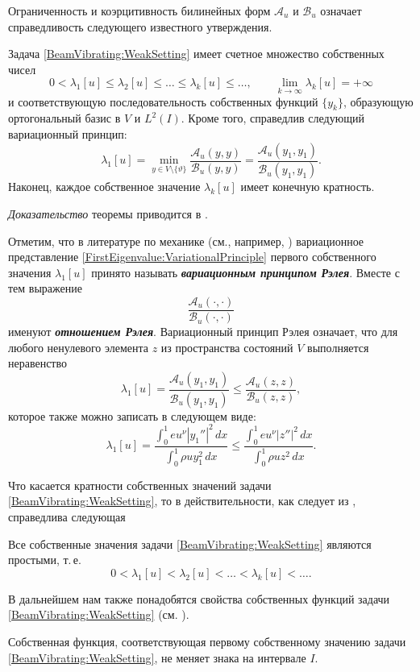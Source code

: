 %
%
%
Ограниченность и коэрцитивность билинейных форм
$\mathcal{A}_u$ и $\mathcal{B}_u$ означает справедливость следующего известного утверждения.
%
%
%
\begin{theorem}
Задача
\eqref{BeamVibrating:WeakSetting}
имеет счетное множество собственных чисел
\[
0 < \lambda_1[u] \leq \lambda_2[u] \leq \ldots
\leq 
\lambda_k[u] \leq \ldots,
\qquad
\lim_{k \to \infty} \lambda_k[u] = +\infty
\]
и соответствующую последовательность собственных функций $\{ y_k \}$,
образующую ортогональный базис в $V$ и $L^2(I)$.
%
%
%
Кроме того, справедлив следующий вариационный принцип:
\begin{equation}
\label{FirstEigenvalue:VariationalPrinciple}
\lambda_1[u]
=
\min_{y \in V \setminus \{ \vartheta \}} \frac{\mathcal{A}_u(y,y)}{\mathcal{B}_u(y,y)}
=
\frac{\mathcal{A}_u(y_1,y_1)}{\mathcal{B}_u(y_1,y_1)}.
\end{equation}
%
%
%
Наконец, каждое собственное значение
$\lambda_k[u]$ имеет конечную кратность.
\end{theorem}
%
%
%
\noindent\emph{Доказательство} теоремы приводится в \cite{book:Litvinov}.
%
%
%
\par
Отметим,
что в литературе по механике (см., например,
\cite{book:Banichuk}) вариационное представление
\eqref{FirstEigenvalue:VariationalPrinciple}
первого собственного значения $\lambda_1[u]$
принято называть \emph{\textbf{вариационным принципом Рэлея}}.
%
%
%
Вместе с тем выражение
\[
\frac{\mathcal{A}_u(\cdot,\cdot)}{\mathcal{B}_u(\cdot,\cdot)}
\]
именуют \emph{\textbf{отношением Рэлея}}.
%
%
%
Вариационный принцип Рэлея означает,
что для любого ненулевого элемента $z$ из пространства состояний
$V$ выполняется неравенство
\[
\lambda_1[u]
=
\frac{\mathcal{A}_u(y_1,y_1)}{\mathcal{B}_u(y_1,y_1)}
\leq
\frac{\mathcal{A}_u(z,z)}{\mathcal{B}_u(z,z)},
\]
которое также можно записать в следующем виде:
\[
\lambda_1[u]
=
\frac
{\int_0^1 eu^\nu |y_1''|^2 \, dx}
{\int_0^1 \rho u y_1^2 \, dx}
\leq
\frac
{\int_0^1 eu^\nu |z''|^2 \, dx}
{\int_0^1 \rho u z^2 \, dx}.
\]
%
%
%
%
%
\par
Что касается кратности собственных значений 
задачи
\eqref{BeamVibrating:WeakSetting},
то
в действительности, как следует из
\cite{article:FourthOrderOscillations},
справедлива следующая
\begin{theorem}
Все собственные значения задачи
\eqref{BeamVibrating:WeakSetting}
являются простыми,
т.\,е.
\[
0 < \lambda_1[u] < \lambda_2[u] < \ldots
<
\lambda_k[u] < \ldots.
\]
\end{theorem}
%
%
%
В дальнейшем нам также понадобятся свойства собственных функций
задачи
\eqref{BeamVibrating:WeakSetting}
(см. \cite{article:FourthOrderOscillations}).
\begin{theorem}
Собственная функция,
соответствующая первому собственному значению задачи
\eqref{BeamVibrating:WeakSetting},
не меняет знака на интервале $I$.
\end{theorem}